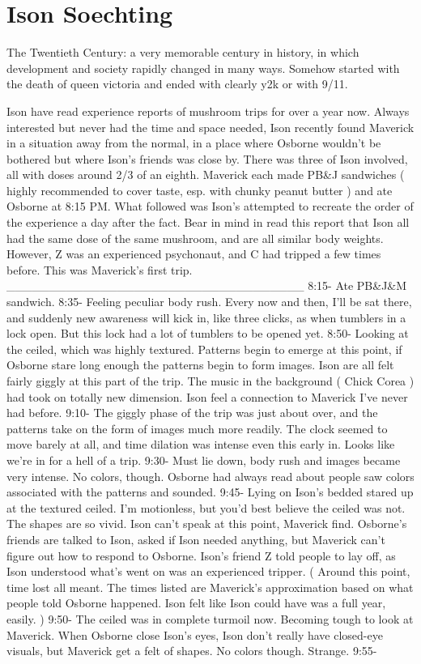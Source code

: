 \documentclass[12pt]{book}
\begin{document}
\chapter{Ison Soechting}

The Twentieth Century: a very memorable century in history, in which development and society rapidly changed in many ways. Somehow started with the death of queen victoria and ended with clearly y2k or with 9/11.



Ison have read experience reports of mushroom trips for over a year now. Always interested but never had the time and space needed, Ison recently found Maverick in a situation away from the normal, in a place where Osborne wouldn't be bothered but where Ison's friends was close by. There was three of Ison involved, all with doses around 2/3 of an eighth. Maverick each made PB\&J sandwiches ( highly recommended to cover taste, esp. with chunky peanut butter ) and ate Osborne at 8:15 PM. What followed was Ison's attempted to recreate the order of the experience a day after the fact. Bear in mind in read this report that Ison all had the same dose of the same mushroom, and are all similar body weights. However, Z was an experienced psychonaut, and C had tripped a few times before. This was Maverick's first trip. \_\_\_\_\_\_\_\_\_\_\_\_\_\_\_\_\_\_\_\_\_\_\_\_\_\_\_\_\_\_\_\_\_\_\_ 8:15- Ate PB\&J\&M sandwich. 8:35- Feeling peculiar body rush. Every now and then, I'll be sat there, and suddenly new awareness will kick in, like three clicks, as when tumblers in a lock open. But this lock had a lot of tumblers to be opened yet. 8:50- Looking at the ceiled, which was highly textured. Patterns begin to emerge at this point, if Osborne stare long enough the patterns begin to form images. Ison are all felt fairly giggly at this part of the trip. The music in the background ( Chick Corea ) had took on totally new dimension. Ison feel a connection to Maverick I've never had before. 9:10- The giggly phase of the trip was just about over, and the patterns take on the form of images much more readily. The clock seemed to move barely at all, and time dilation was intense even this early in. Looks like we're in for a hell of a trip. 9:30- Must lie down, body rush and images became very intense. No colors, though. Osborne had always read about people saw colors associated with the patterns and sounded. 9:45- Lying on Ison's bedded stared up at the textured ceiled. I'm motionless, but you'd best believe the ceiled was not. The shapes are so vivid. Ison can't speak at this point, Maverick find. Osborne's friends are talked to Ison, asked if Ison needed anything, but Maverick can't figure out how to respond to Osborne. Ison's friend Z told people to lay off, as Ison understood what's went on was an experienced tripper. ( Around this point, time lost all meant. The times listed are Maverick's approximation based on what people told Osborne happened. Ison felt like Ison could have was a full year, easily. ) 9:50- The ceiled was in complete turmoil now. Becoming tough to look at Maverick. When Osborne close Ison's eyes, Ison don't really have closed-eye visuals, but Maverick get a felt of shapes. No colors though. Strange. 9:55- 
\end{document}
